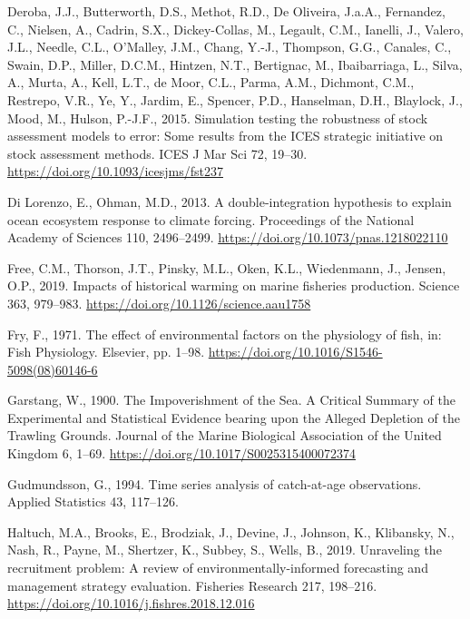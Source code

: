 \documentclass[]{article}
\begin{document}
\leavevmode\hypertarget{ref-deroba2015Simulation}{}%
Deroba, J.J., Butterworth, D.S., Methot, R.D., De Oliveira, J.a.A.,
Fernandez, C., Nielsen, A., Cadrin, S.X., Dickey-Collas, M., Legault,
C.M., Ianelli, J., Valero, J.L., Needle, C.L., O'Malley, J.M., Chang,
Y.-J., Thompson, G.G., Canales, C., Swain, D.P., Miller, D.C.M.,
Hintzen, N.T., Bertignac, M., Ibaibarriaga, L., Silva, A., Murta, A.,
Kell, L.T., de Moor, C.L., Parma, A.M., Dichmont, C.M., Restrepo, V.R.,
Ye, Y., Jardim, E., Spencer, P.D., Hanselman, D.H., Blaylock, J., Mood,
M., Hulson, P.-J.F., 2015. Simulation testing the robustness of stock
assessment models to error: Some results from the ICES strategic
initiative on stock assessment methods. ICES J Mar Sci 72, 19--30.
\url{https://doi.org/10.1093/icesjms/fst237}

\leavevmode\hypertarget{ref-dilorenzo2013Doubleintegration}{}%
Di Lorenzo, E., Ohman, M.D., 2013. A double-integration hypothesis to
explain ocean ecosystem response to climate forcing. Proceedings of the
National Academy of Sciences 110, 2496--2499.
\url{https://doi.org/10.1073/pnas.1218022110}

\leavevmode\hypertarget{ref-free2019Impacts}{}%
Free, C.M., Thorson, J.T., Pinsky, M.L., Oken, K.L., Wiedenmann, J.,
Jensen, O.P., 2019. Impacts of historical warming on marine fisheries
production. Science 363, 979--983.
\url{https://doi.org/10.1126/science.aau1758}

\leavevmode\hypertarget{ref-fry1971Effect}{}%
Fry, F., 1971. The effect of environmental factors on the physiology of
fish, in: Fish Physiology. Elsevier, pp. 1--98.
\url{https://doi.org/10.1016/S1546-5098(08)60146-6}

\leavevmode\hypertarget{ref-garstang1900Impoverishment}{}%
Garstang, W., 1900. The Impoverishment of the Sea. A Critical Summary of
the Experimental and Statistical Evidence bearing upon the Alleged
Depletion of the Trawling Grounds. Journal of the Marine Biological
Association of the United Kingdom 6, 1--69.
\url{https://doi.org/10.1017/S0025315400072374}

\leavevmode\hypertarget{ref-gudmundsson1994Time}{}%
Gudmundsson, G., 1994. Time series analysis of catch-at-age
observations. Applied Statistics 43, 117--126.

\leavevmode\hypertarget{ref-haltuch2019Unraveling}{}%
Haltuch, M.A., Brooks, E., Brodziak, J., Devine, J., Johnson, K.,
Klibansky, N., Nash, R., Payne, M., Shertzer, K., Subbey, S., Wells, B.,
2019. Unraveling the recruitment problem: A review of
environmentally-informed forecasting and management strategy evaluation.
Fisheries Research 217, 198--216.
\url{https://doi.org/10.1016/j.fishres.2018.12.016}
\end{document}
